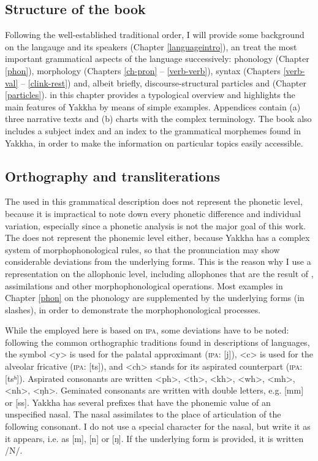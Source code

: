 \subsection{Structure of the book}


Following the well-established traditional order, I will provide some background on the langauge and its speakers (Chapter \ref{languageintro}), an treat the most important grammatical aspects of the language successively: phonology (Chapter \ref{phon}), morphology (Chapters \ref{ch-pron} – \ref{verb-verb}), syntax (Chapters \ref{verb-val} – \ref{clink-rest}) and, albeit briefly, discourse-structural particles and  (Chapter \ref{particles}).  in this chapter provides a typological overview and highlights the main features of Yakkha by means of simple examples. Appendices contain (a) three narrative texts and  (b) charts with the complex  terminology. The book also includes  a subject index and an index to the grammatical morphemes found in Yakkha, in order to make the information on particular topics easily accessible. 

\subsection{Orthography and transliterations}\label{orth}

The  used in this grammatical description does not represent the phonetic level, because it is impractical to note down every phonetic difference and individual variation, especially since a phonetic analysis is not the major goal of this work. The  does not represent the phonemic level either, because Yakkha has a complex system of morphophonological rules, so that the pronunciation may show considerable deviations from the underlying forms. This is the reason why I use a representation on the allophonic level, including allophones that are the result of , assimilations and other morphophonological operations. Most examples in Chapter \ref{phon} on the phonology  are supplemented by the underlying forms (in slashes), in order to demonstrate the morphophonological processes.

While the   employed here is based on \textsc{ipa}, some deviations have to be noted: following the common orthographic traditions found in descriptions of  languages, the symbol <y> is used for the palatal approximant (\textsc{ipa}: [j]), <c> is used for the alveolar fricative (\textsc{ipa}: [ts]), and <ch> stands for its aspirated counterpart (\textsc{ipa}: [tsʰ]). Aspirated consonants are written <ph>, <th>, <kh>, <wh>, <mh>, <nh>, <ŋh>. Geminated consonants are written with double letters, e.g. [mm] or [ss]. Yakkha has several prefixes that have the phonemic value of an unspecified  nasal. The nasal assimilates to the place of articulation of the following consonant. I do not use a special character for the nasal, but write it as it appears, i.e. as [m], [n] or [ŋ]. If the underlying form is provided, it is written /N/. 

